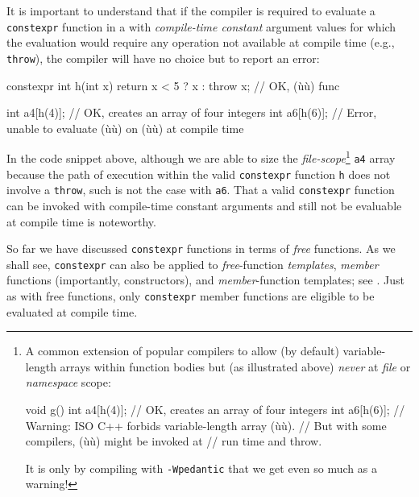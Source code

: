 It is important to understand that if the compiler is required to
evaluate a \lstinline!constexpr! function in a 
with \emph{compile-time constant} argument values for which the
evaluation would require any operation not available at compile time
(e.g., \lstinline!throw!), the compiler will have no choice but to report
an error:

\begin{emcppslisting}[emcppsbatch=e3]
constexpr int h(int x) { return x < 5 ? x : throw x; }  // OK, (ù{}ù) func

int a4[h(4)];  // OK, creates an array of four integers
int a6[h(6)];  // Error, unable to evaluate (ù{}ù) on (ù{}ù) at compile time
\end{emcppslisting}
    

\noindent In the code snippet above, although we are able to size the
\emph{file-scope}{\cprotect\footnote{A common extension of popular
compilers to allow (by default) variable-length arrays within function
bodies but (as illustrated above) \emph{never} at \emph{file} or
\emph{namespace} scope:

\begin{emcppslisting}[emcppsbatch=e3,style=footcode,emcppserrorlines={4}]
void g()
{
    int a4[h(4)];  // OK, creates an array of four integers
    int a6[h(6)];  // Warning: ISO C++ forbids variable-length array (ù{}ù).
                   // But with some compilers, (ù{}ù) might be invoked at
                   // run time and throw.
}
\end{emcppslisting}
    
\noindent It is only by compiling with \lstinline!-Wpedantic! that we get even so
  much as a warning!}} \lstinline!a4! array because the path of execution
within the valid \lstinline!constexpr! function \lstinline!h! does not involve
a \lstinline!throw!, such is not the case with \lstinline!a6!. That a valid
\lstinline!constexpr! function can be invoked with compile-time constant
arguments and still not be evaluable at compile time is noteworthy.

So far we have discussed \lstinline!constexpr! functions in terms of
\emph{free} functions. As we shall see, \lstinline!constexpr! can also be
applied to \emph{free}-function \emph{templates}, \emph{member}
functions (importantly, constructors), and \emph{member}-function
templates; see .
Just as with free functions, only \lstinline!constexpr! member functions
are eligible to be evaluated at compile time.

